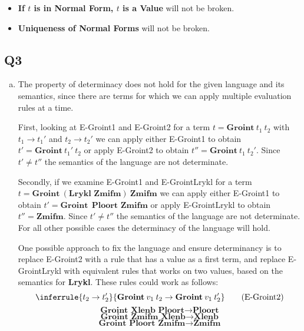 \documentclass[12pt, fleqn]{article}
\begin{document}
\begin{enumerate}[(a)]
\begin{itemize}
        \item \textbf{If $t$ is in Normal Form, $t$ is a Value} will not be broken.
        \item \textbf{Uniqueness of Normal Forms} will not be broken.
    \end{itemize}

\end{enumerate}

\subsection{Q3}

\begin{enumerate}[(a)]
    \item The property of determinacy does not hold for the given language and its semantics, since there are terms for which we can apply multiple evaluation rules at a time.
    
    First, looking at E-Groint1 and E-Groint2 for a term $t = \textbf{Groint}\:t_1\:t_2$ with $t_1 \rightarrow t_1'$ and $t_2 \rightarrow t_2'$ we can apply either E-Groint1 to obtain $t' = \textbf{Groint}\:t_1'\:t_2$ or apply E-Groint2 to obtain $t'' = \textbf{Groint}\:t_1\:t_2'$. Since $t' \neq t''$ the semantics of the language are not determinate.

    Secondly, if we examine E-Groint1 and E-GrointLrykl for a term \\$t = \textbf{Groint}\:(\textbf{Lrykl Zmifm})\:\textbf{Zmifm}$ we can apply either E-Groint1 to obtain $t' = \textbf{Groint}\:\:\textbf{Ploort Zmifm}$ or apply E-GrointLrykl to obtain $t'' = \textbf{Zmifm}$. Since $t' \neq t''$ the semantics of the language are not determinate. For all other possible cases the determinacy of the language will hold.

    One possible approach to fix the language and ensure determinancy is to replace E-Groint2 with a rule that has a value as a first term, and replace E-GrointLrykl with equivalent rules that works on two values, based on the semantics for \textbf{Lrykl}. These rules could work as follows:
    \begin{equation}
        \inferrule{ t_2 \rightarrow t_2' }{ \textbf{Groint}\:v_1\:t_2 \rightarrow \textbf{Groint}\:v_1\:t_2'} \tag{E-Groint2}
    \end{equation}
    \begin{equation}
        { \textbf{Groint Xlenb Ploort} \rightarrow \textbf{Ploort}} \tag{E-GrointXP}
    \end{equation}
    \begin{equation}
        { \textbf{Groint Zmifm Xlenb} \rightarrow \textbf{Xlenb}} \tag{E-GrointZX}
    \end{equation}
    \begin{equation}
        { \textbf{Groint Ploort Zmifm} \rightarrow \textbf{Zmifm}} \tag{E-GrointPZ}
    \end{equation}


\end{enumerate}
\end{document}
